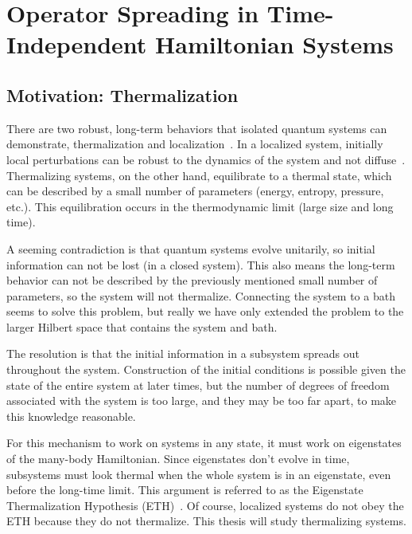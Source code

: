 \section{Operator Spreading in Time-Independent Hamiltonian Systems} \label{sec:opsp}


\subsection{Motivation: Thermalization} \label{sub:therm}

There are two robust, long-term behaviors that isolated quantum systems can demonstrate, thermalization and localization~\cite{Nandkishore2015}. In a localized system, initially local perturbations can be robust to the dynamics of the system and not diffuse~\cite{Anderson58}. Thermalizing systems, on the other hand, equilibrate to a thermal state, which can be described by a small number of parameters (energy, entropy, pressure, etc.). This equilibration occurs in the thermodynamic limit (large size and long time). 

A seeming contradiction is that quantum systems evolve unitarily, so initial information can not be lost (in a closed system). This also means the long-term behavior can not be described by the previously mentioned small number of parameters, so the system will not thermalize. Connecting the system to a bath seems to solve this problem, but really we have only extended the problem to the larger Hilbert space that contains the system and bath. 

The resolution is that the initial information in a subsystem spreads out throughout the system. Construction of the initial conditions is possible given the state of the entire system at later times, but the number of degrees of freedom associated with the system is too large, and they may be too far apart, to make this knowledge reasonable. 

For this mechanism to work on systems in any state, it must work on eigenstates of the many-body Hamiltonian. Since eigenstates don't evolve in time, subsystems must look thermal when the whole system is in an eigenstate, even before the long-time limit. This argument is referred to as the Eigenstate Thermalization Hypothesis (ETH)~\cite{Deutsch91, Srednicki1994, Rigol2008, Nandkishore2015}. Of course, localized systems do not obey the ETH because they do not thermalize. This thesis will study thermalizing systems.

